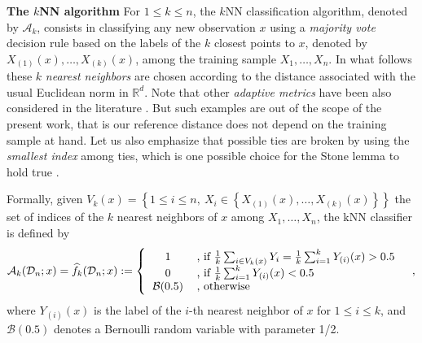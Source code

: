 \documentclass[twoside,11pt]{article}
\numberwithin{equation}{section}
\newcommand{\1}{\mathds{1}}%
\newcommand{\acc}[1]{\left\{ #1 \right\}}
\newcommand{\defegal}{:=} %
\newcommand{\R}{\mathbb{R}}
\newcommand{\D}{\mathcal{D}}
\newcommand{\A}{\mathcal{A}}
\numberwithin{equation}{section}
\theoremstyle{plain}
\begin{document}
\noindent\textbf{The $k$NN algorithm}
For $1\leq k\leq n$, the $k$NN classification algorithm, denoted by $\A_k$, consists in classifying any new observation $x$ using a \emph{majority vote} decision rule based on the labels of the $k$ closest points to $x$, denoted by $X_{(1)}(x),\ldots,X_{(k)}(x)$, among the training sample $X_{1},\ldots,X_n$.
%
In what follows these $k$ \emph{nearest neighbors} are chosen according to the distance associated with the usual Euclidean norm in $\R^d$.
%
Note that other \emph{adaptive metrics} have been also considered in the literature \citep[see for instance][Chap.~14 ]{Has_Tib_Fri:2001}. But such examples are out of the scope of the present work, that is our reference distance does not depend on the training sample at hand.
%
Let us also emphasize that possible ties are broken by using the \emph{smallest index} among ties, which is one possible choice for the Stone lemma to hold true \citep[][Lemma~10.6, p.125]{BiauDevroye_2016}.

Formally, given $V_k(x) = \acc{1\leq i\leq n,\ X_i \in \acc{X_{(1)}(x),\ldots,X_{(k)}(x)}}$ the set of indices of the $k$ nearest neighbors of $x$ among $X_1,\ldots,X_n$, the kNN classifier is defined by
%
\begin{eqnarray} \label{def.knn.classifier}
\A_k(\D_n;x) = \widehat{f}_k(\D_n;x) \defegal
\left\{
\begin{tabular}{cl}
1 &, if $\frac{1}{k}\sum_{i \in V_k(x)} Y_i =\frac{1}{k}\sum_{i =1}^k Y_{(i)}(x) > 0.5$ \\
%
0 &, if $\frac{1}{k}\sum_{i =1}^k Y_{(i)}(x) < 0.5$\\
%
\mbox{$\mathcal{B}$}(0.5) &, \mbox{otherwise}
\end{tabular}
\right. \ \ ,
\end{eqnarray}
where $Y_{(i)}(x)$ is the label of the $i$-th nearest neighbor of $x$ for $1\leq i \leq k$, and $\mathcal{B}(0.5)$ denotes a Bernoulli random variable with parameter 1/2.
%
\end{document}
